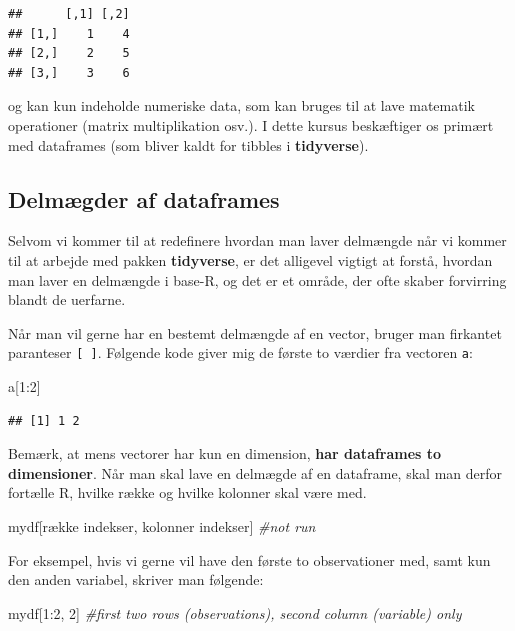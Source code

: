 \documentclass[
]{book}
\newenvironment{Shaded}{\begin{snugshade}}{\end{snugshade}}
\newcommand{\CommentTok}[1]{\textcolor[rgb]{0.56,0.35,0.01}{\textit{#1}}}
\newcommand{\DecValTok}[1]{\textcolor[rgb]{0.00,0.00,0.81}{#1}}
\newcommand{\NormalTok}[1]{#1}
\newcommand{\SpecialCharTok}[1]{\textcolor[rgb]{0.00,0.00,0.00}{#1}}
\begin{document}
\begin{verbatim}
##      [,1] [,2]
## [1,]    1    4
## [2,]    2    5
## [3,]    3    6
\end{verbatim}

og kan kun indeholde numeriske data, som kan bruges til at lave matematik operationer (matrix multiplikation osv.). I dette kursus beskæftiger os primært med dataframes (som bliver kaldt for tibbles i \textbf{tidyverse}).

\hypertarget{delmuxe6gder-af-dataframes}{%
\subsection{Delmægder af dataframes}\label{delmuxe6gder-af-dataframes}}

Selvom vi kommer til at redefinere hvordan man laver delmængde når vi kommer til at arbejde med pakken \textbf{tidyverse}, er det alligevel vigtigt at forstå, hvordan man laver en delmængde i base-R, og det er et område, der ofte skaber forvirring blandt de uerfarne.

Når man vil gerne har en bestemt delmængde af en vector, bruger man firkantet paranteser \texttt{{[}\ {]}}. Følgende kode giver mig de første to værdier fra vectoren \texttt{a}:

\begin{Shaded}
\begin{Highlighting}[]
\NormalTok{a[}\DecValTok{1}\SpecialCharTok{:}\DecValTok{2}\NormalTok{]}
\end{Highlighting}
\end{Shaded}

\begin{verbatim}
## [1] 1 2
\end{verbatim}

Bemærk, at mens vectorer har kun en dimension, \textbf{har dataframes to dimensioner}. Når man skal lave en delmægde af en dataframe, skal man derfor fortælle R, hvilke række og hvilke kolonner skal være med.

\begin{Shaded}
\begin{Highlighting}[]
\NormalTok{mydf[række indekser, kolonner indekser]  }\CommentTok{\#not run}
\end{Highlighting}
\end{Shaded}

For eksempel, hvis vi gerne vil have den første to observationer med, samt kun den anden variabel, skriver man følgende:

\begin{Shaded}
\begin{Highlighting}[]
\NormalTok{mydf[}\DecValTok{1}\SpecialCharTok{:}\DecValTok{2}\NormalTok{, }\DecValTok{2}\NormalTok{]  }\CommentTok{\#first two rows (observations), second column (variable) only}
\end{Highlighting}
\end{Shaded}
\end{document}
